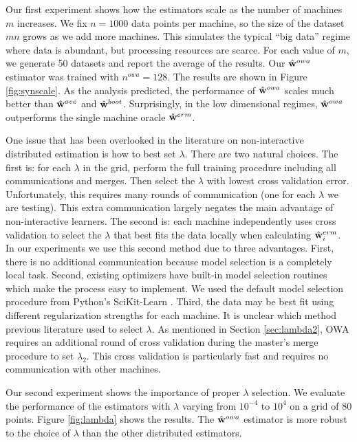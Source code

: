 \documentclass[thesis.tex]{subfiles}
\newcommand{\nowa}{n^{\textit{owa}}}
\begin{document}
Our first experiment shows how the estimators scale as the number of machines $m$ increases.
We fix $n=1000$ data points per machine,
so the size of the dataset $mn$ grows as we add more machines.
This simulates the typical ``big data'' regime where data is abundant,
but processing resources are scarce.
For each value of $m$, we generate 50 datasets and report the average of the results.
Our $\hat{\mathbf w}^{owa}$ estimator was trained with $\nowa=128$.
The results are shown in Figure \ref{fig:synscale}.
As the analysis predicted, the performance of $\hat{\mathbf w}^{owa}$ scales much better than $\hat{\mathbf w}^{ave}$ and $\hat{\mathbf w}^{boot}$.
Surprisingly, in the low dimensional regimes, $\hat{\mathbf w}^{owa}$ outperforms the single machine oracle $\hat{\mathbf w}^{erm}$.

One issue that has been overlooked in the literature on non-interactive distributed estimation is how to best set $\lambda$.
There are two natural choices. %
The first is: for each $\lambda$ in the grid, perform the full training procedure including all communications and merges.
Then select the $\lambda$ with lowest cross validation error.
Unfortunately, this requires many rounds of communication (one for each $\lambda$ we are testing).
This extra communication largely negates the main advantage of non-interactive learners.
The second is: each machine independently uses cross validation to select the $\lambda$ that best fits the data locally when calculating $\hat{\mathbf w}^{erm}_i$.
In our experiments we use this second method due to three advantages.
First, there is no additional communication because model selection is a completely local task.
Second, existing optimizers have built-in model selection routines which make the process easy to implement.
We used the default model selection procedure from Python's SciKit-Learn \citep{scikit-learn}.
Third, the data may be best fit using different regularization strengths for each machine.
It is unclear which method previous literature used to select $\lambda$.
As mentioned in Section \ref{sec:lambda2}, OWA requires an additional round of cross validation during the master's merge procedure to set $\lambda_2$.
This cross validation is particularly fast and requires no communication with other machines.

Our second experiment shows the importance of proper $\lambda$ selection.
We evaluate the performance of the estimators with $\lambda$ varying from $10^{-4}$ to $10^4$ on a grid of 80 points.
Figure \ref{fig:lambda} shows the results. 
The $\hat{\mathbf w}^{owa}$ estimator is more robust to the choice of $\lambda$ than the other distributed estimators.
\end{document}
